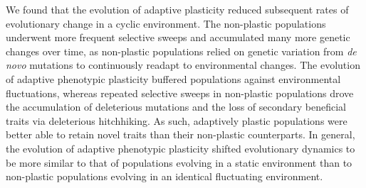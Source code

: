 We found that the evolution of adaptive plasticity reduced subsequent rates of evolutionary change in a cyclic environment.
The non-plastic populations underwent more frequent selective sweeps and accumulated many more genetic changes over time, as non-plastic populations relied on genetic variation from \textit{de novo} mutations to continuously readapt to environmental changes.
The evolution of adaptive phenotypic plasticity buffered populations against environmental fluctuations, whereas repeated selective sweeps in non-plastic populations drove the accumulation of deleterious mutations and the loss of secondary beneficial traits via deleterious hitchhiking.
As such, adaptively plastic populations were better able to retain novel traits than their non-plastic counterparts.
In general, the evolution of adaptive phenotypic plasticity shifted evolutionary dynamics to be more similar to that of populations evolving in a static environment than to non-plastic populations evolving in an identical fluctuating environment.

